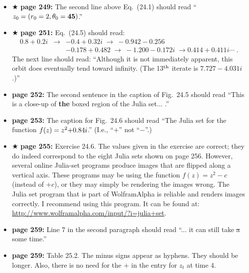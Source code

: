 \documentclass[12pt]{article}
\begin{document}
\begin{itemize}
  \item $\bigstar$ {\bf page 249:} The second line above Eq.~(24.1)
    should read ``$z_0 = (r_0 = 2, \theta_0 =  {\bf 45})$.''

  \item $\bigstar$ {\bf page 251:} Eq.~(24.5) should read:
\begin{eqnarray}
  0.8 + 0.2i & \longrightarrow & -0.4 + 0.32i \; \longrightarrow \;
  -0.942 - 0.256\\
& & -0.178 + 0.482 \; \longrightarrow \; -1.200 - 0.172i \;
  \longrightarrow  0.414 + 0.411i \cdots \;.
\end{eqnarray}
The next line should read: ``Although it is not immediately apparent,
this orbit does eventually tend toward infinity.  (The 13$^{\rm th}$
iterate is $7.727 - 4.031i$.)''

  \item {\bf page 252:}  The second sentence in the caption of
    Fig.~24.5 should read ``This is a close-up of {\bf the} boxed
    region of the Julia set... .''

\item {\bf page 253:}  The caption for Fig.~24.6 should read ``The
  Julia set for the function $f(z) = z^2 {\bf +} 0.84i$.'' (I.e., ``$+$''
  not ``$-$''.)

\item $\bigstar$ {\bf page 255:}  Exercise 24.6.  The values given in
  the exercise are correct; they do indeed correspond to the eight
  Julia sets shown on page 256.  However, several online Julia-set
  programs produce images that are flipped along a vertical axis.  These
  programs may be using the function $f(z) = z^2 - c$ (instead of
  $+c$), or they may simply be rendering the images wrong.  The Julia
  set program that is part of WolframAlpha is reliable and renders
  images correctly.  I recommend using this program.  It can be found
  at: \url{http://www.wolframalpha.com/input/?i=julia+set}. 

\item {\bf page 259:}  Line $7$ in the second paragraph should read
  ``... it can still take \sout{a} some time.'' %

\item {\bf page 259:}  Table 25.2.  The minus signs appear as hyphens.
  They should be longer.  Also, there is no need for the $+$ in the
  entry for $z_t$ at time $4$.


\end{itemize}
\end{document}
